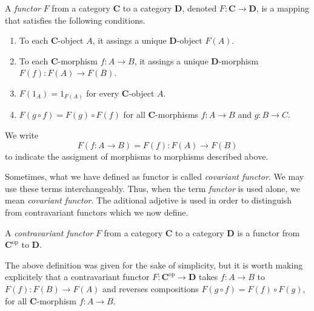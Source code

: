 \begin{definition}[Functor]
A \textit{functor} \(F\) from a category \(\mathbf{C}\) to a category \(\mathbf{D}\), denoted \(F\colon \mathbf{C} \to \mathbf{D}\),  is a mapping that satisfies the following conditions. 
\begin{enumerate}[label=(\roman*),left=-2mm]
    \item To each \(\mathbf{C}\)-object \(A\), it assings a unique \(\mathbf{D}\)-object \(F(A)\).
    \item To each \(\mathbf{C}\)-morphism \(f\colon A\to B\), it assings a unique \(\mathbf{D}\)-morphism \(F(f)\colon F(A)\to  F(B)\).
    \item \(F(1_A) = 1_{F(A)}\) for every \(\mathbf{C}\)-object \(A\).
    \item \(F(g\circ f) = F(g) \circ F(f)\) for all \(\mathbf{C}\)-morphisms \(f\colon A\to B\) and \(g\colon B\to C\).
\end{enumerate}
\end{definition}

\begin{remark}
    We write \[F(f\colon A\to B) = F(f): F(A)\to F(B)\]
    to indicate the assigment of morphisms to morphisms described above.
\end{remark}

Sometimes, what we have defined as functor is called \textit{covariant functor}. We may use these terms  interchangeably. Thus, when  the term  \textit{functor} is used alone, we mean \textit{covariant functor}. The aditional adjetive is used in order to distinguish from contravariant functors which we now define.

\begin{definition}
A \textit{contravariant functor} \(F\)  from a category \(\mathbf{C}\) to a category \(\mathbf{D}\) is a functor from  \(\mathbf{C}^{\text{op}}\) to \(\mathbf{D}\). 
\end{definition}

The above definition was given for the sake of simplicity, but it is worth making explicitely  that a contravariant functor \(F\colon \mathbf{C}^{\text{op}}\to \mathbf{D}\) takes \(f\colon A\to B\) to \(F(f) \colon F(B)\to F(A)\) and reverses compositions  \(F(g\circ f) = F(f)\circ F(g)\), for all \(\mathbf{C}\)-morphism \(f\colon A\to B\).


